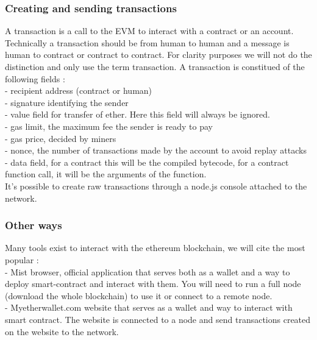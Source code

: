 \documentclass[11pt, a4paper, twoside, openright]{book} %
\begin{document}
\subsubsection{Creating and sending transactions}
A transaction is a call to the EVM to interact with a contract or an account. Technically a transaction should be from human to human and a message is human to contract or contract to contract. For clarity purposes we will not do the distinction and only use the term transaction. A transaction is constitued of the following fields : \\
- recipient address (contract or human) \\
- signature identifying the sender \\
- value field for transfer of ether. Here this field will always be ignored.\\
- gas limit, the maximum fee the sender is ready to pay \\
- gas price, decided by miners \\
- nonce, the number of transactions made by the account to avoid replay attacks\\
- data field, for a contract this will be the compiled bytecode, for a contract function call, it will be the arguments of the function. \\

It's possible to create raw transactions through a node.js console attached to the network.


\subsubsection{Other ways}
Many tools exist to interact with the ethereum blockchain, we will cite the most popular : \\
- Mist browser, official application that serves both as a wallet and a way to deploy smart-contract and interact with them. You will need to run a full node (download the whole blockchain) to use it or connect to a remote node.\\
- Myetherwallet.com website that serves as a wallet and way to interact with smart contract. The website is connected to a node and send transactions created on the website to the network.
\end{document}
